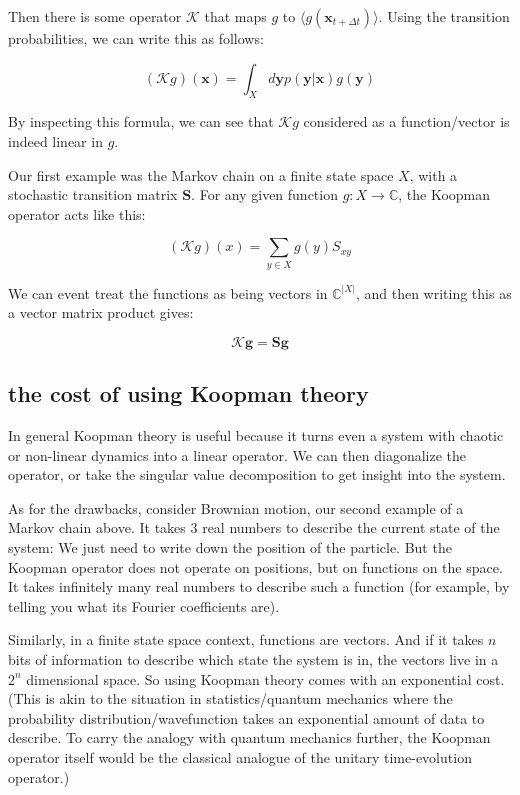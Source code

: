 \documentclass[]{article}
\newcommand{\w}[1]{\mathbf{#1}}
\newcommand{\CC}{\mathbb{C}}
\newcommand{\Kp}{\mathcal{K}}
\begin{document}
Then there is some operator $\Kp$ that maps $g$ to $\langle g(\w{x}_{t+\Delta t})\rangle$. Using the transition probabilities, we can write this as follows:

$$
(\Kp g)(\w{x}) = \int_X d\w{y} p(\w{y}|\w{x}) g(\w{y})
$$

By inspecting this formula, we can see that $\Kp g$ considered as a function/vector is indeed linear in $g$.

Our first example was the Markov chain on a finite state space $X$, with a stochastic transition matrix $\w{S}$. For any given function $g:X \to \CC$, the Koopman operator acts like this:

$$
(\Kp g)(x) = \sum_{y\in X} g(y) S_{xy}
$$

We can event treat the functions as being vectors in $\CC^{|X|}$, and then writing this as a vector matrix product gives:

$$
\Kp \w{g} = \w{S}\w{g}
$$


\subsection{the cost of using Koopman theory}

In general Koopman theory is useful because it turns even a system with chaotic or non-linear dynamics into a linear operator. We can then diagonalize the operator, or take the singular value decomposition to get insight into the system.

As for the drawbacks, consider Brownian motion, our second example of a Markov chain above. It takes 3 real numbers to describe the current state of the system: We just need to write down the position of the particle. But the Koopman operator does not operate on positions, but on functions on the space. It takes infinitely many real numbers to describe such a function (for example, by telling you what its Fourier coefficients are).

Similarly, in a finite state space context, functions are vectors. And if it takes $n$ bits of information to describe which state the system is in, the vectors live in a $2^n$ dimensional space. So using Koopman theory comes with an exponential cost. (This is akin to the situation in statistics/quantum mechanics where the probability distribution/wavefunction takes an exponential amount of data to describe. To carry the analogy with quantum mechanics further, the Koopman operator itself would be the classical analogue of the unitary time-evolution operator.)
\end{document}
